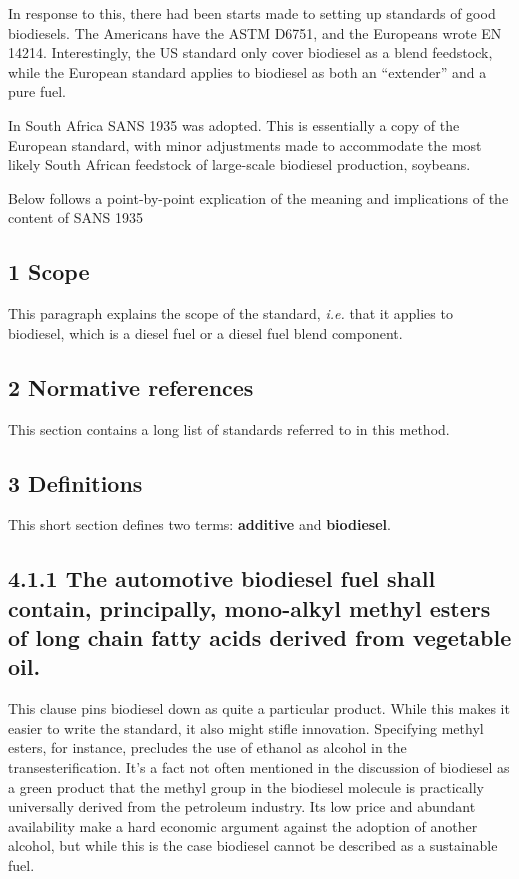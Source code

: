In response to this, there had been starts made to setting up standards of good biodiesels. The Americans have the ASTM D6751, and the Europeans wrote EN 14214. Interestingly, the US standard only cover biodiesel as a blend feedstock, while the European standard applies to biodiesel as both an ``extender'' and a pure fuel. 

In South Africa SANS 1935 \cite{SANS1935} was adopted. This is essentially a copy of the European standard, with minor adjustments made to accommodate the most likely South African feedstock of large-scale biodiesel production, soybeans.

Below follows a point-by-point explication of the meaning and implications of the content of SANS 1935

\subsection{1 Scope}

This paragraph explains the scope of the standard, \textit{i.e.} that it applies to biodiesel, which is a diesel fuel or a diesel fuel blend component.

\subsection{2 Normative references}

This section contains a long list of standards referred to in this method. 

\subsection{3 Definitions}

This short section defines two terms: \textbf{additive} and \textbf{ biodiesel}.

\subsection{4.1.1 The automotive biodiesel fuel shall contain, principally, mono-alkyl methyl esters of long chain
fatty acids derived from vegetable oil.}

This clause pins biodiesel down as quite a particular product. While this makes it easier to write the standard, it also might stifle innovation. Specifying methyl esters, for instance, precludes the use of ethanol as alcohol in the transesterification. It's a fact not often mentioned in the discussion of biodiesel as a green product that the methyl group in the biodiesel molecule is practically universally derived from the petroleum industry. Its low price and abundant availability make a hard economic argument against the adoption of another alcohol, but while this is the case biodiesel cannot be described as a sustainable fuel. 

